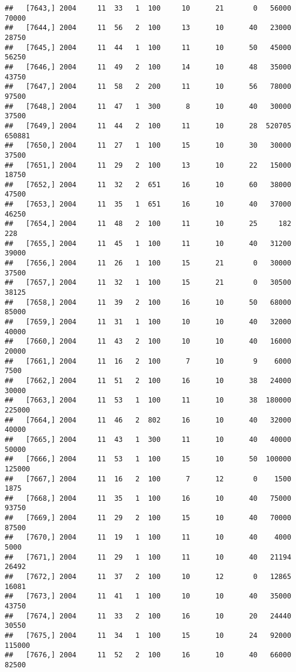 \documentclass{article}\usepackage[]{graphicx}\usepackage[]{color}
\makeatletter
\newenvironment{kframe}{%
 \def\at@end@of@kframe{}%
 \ifinner\ifhmode%
  \def\at@end@of@kframe{\end{minipage}}%
  \begin{minipage}{\columnwidth}%
 \fi\fi%
 \def\FrameCommand##1{\hskip\@totalleftmargin \hskip-\fboxsep
 \colorbox{shadecolor}{##1}\hskip-\fboxsep
     \hskip-\linewidth \hskip-\@totalleftmargin \hskip\columnwidth}%
 \MakeFramed {\advance\hsize-\width
   \@totalleftmargin\z@ \linewidth\hsize
   \@setminipage}}%
 {\par\unskip\endMakeFramed%
 \at@end@of@kframe}
\newenvironment{knitrout}{}{} %
\makeatother
\begin{document}
\begin{knitrout}
\begin{kframe}
\begin{verbatim}
##   [7643,] 2004     11  33   1  100     10      21       0   56000   70000
##   [7644,] 2004     11  56   2  100     13      10      40   23000   28750
##   [7645,] 2004     11  44   1  100     11      10      50   45000   56250
##   [7646,] 2004     11  49   2  100     14      10      48   35000   43750
##   [7647,] 2004     11  58   2  200     11      10      56   78000   97500
##   [7648,] 2004     11  47   1  300      8      10      40   30000   37500
##   [7649,] 2004     11  44   2  100     11      10      28  520705  650881
##   [7650,] 2004     11  27   1  100     15      10      30   30000   37500
##   [7651,] 2004     11  29   2  100     13      10      22   15000   18750
##   [7652,] 2004     11  32   2  651     16      10      60   38000   47500
##   [7653,] 2004     11  35   1  651     16      10      40   37000   46250
##   [7654,] 2004     11  48   2  100     11      10      25     182     228
##   [7655,] 2004     11  45   1  100     11      10      40   31200   39000
##   [7656,] 2004     11  26   1  100     15      21       0   30000   37500
##   [7657,] 2004     11  32   1  100     15      21       0   30500   38125
##   [7658,] 2004     11  39   2  100     16      10      50   68000   85000
##   [7659,] 2004     11  31   1  100     10      10      40   32000   40000
##   [7660,] 2004     11  43   2  100     10      10      40   16000   20000
##   [7661,] 2004     11  16   2  100      7      10       9    6000    7500
##   [7662,] 2004     11  51   2  100     16      10      38   24000   30000
##   [7663,] 2004     11  53   1  100     11      10      38  180000  225000
##   [7664,] 2004     11  46   2  802     16      10      40   32000   40000
##   [7665,] 2004     11  43   1  300     11      10      40   40000   50000
##   [7666,] 2004     11  53   1  100     15      10      50  100000  125000
##   [7667,] 2004     11  16   2  100      7      12       0    1500    1875
##   [7668,] 2004     11  35   1  100     16      10      40   75000   93750
##   [7669,] 2004     11  29   2  100     15      10      40   70000   87500
##   [7670,] 2004     11  19   1  100     11      10      40    4000    5000
##   [7671,] 2004     11  29   1  100     11      10      40   21194   26492
##   [7672,] 2004     11  37   2  100     10      12       0   12865   16081
##   [7673,] 2004     11  41   1  100     10      10      40   35000   43750
##   [7674,] 2004     11  33   2  100     16      10      20   24440   30550
##   [7675,] 2004     11  34   1  100     15      10      24   92000  115000
##   [7676,] 2004     11  52   2  100     16      10      40   66000   82500

\end{verbatim}
\end{kframe}
\end{knitrout}
\end{document}
